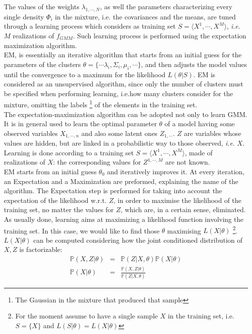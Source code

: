 \documentclass{article}
\begin{document}
The values of the weights $\lambda_{1,\cdots,N}$, as well the parameters characterizing every single density $\Phi_i$ in the mixture, i.e. the covariances and the means, are tuned through a learning process which considers as training set $S = \langle X^1, \cdots  , X^M \rangle$, \textit{i.e.} $M$ realizations of $f_{GMM}$. Such learning process is performed using the expectation maximization algorithm.
\\
EM, is essentially an iterative algorithm that starts from an initial guess for the parameters of the clusters $\theta = \lbrace \cdots \lambda_i, \Sigma_i, \mu_i, \cdots \rbrace$, and then adjusts the model values until the convergence to a maximum for the likelihood $L(\theta | S)$.
EM is considered as an unsupervised algorithm, since only the number of clusters must be specified when performing learning, i.e.how many clusters consider for the mixture, omitting the labels \footnote{The Gaussian in the mixture that produced that sample} of the elements in the training set.
\\
The expectation-maximization algorithm can be adopted not only to learn GMM.  It is in general used to learn the optimal parameter $\theta$ of a model having some observed variables $X_{1,\cdots,n}$ and also some latent ones $Z_{1,\cdots}$. $Z$ are variables whose values are hidden, but are linked in a probabilistic way to those observed, \textit{i.e.} $X$. 
Learning is done according to a training set $S = \langle X^1, \cdots , X^M \rangle$, made of realizations of $X$: the corresponding values for $Z^{1,\cdots,M}$ are not known.  
\\
EM starts from an initial guess $\theta_0$ and iteratively improves it.
At every iteration, an Expectation and a Maximization are preformed, explaining the name of the algorithm. The Expectation step is performed for taking into account the expectation of the likelihood w.r.t. $Z$, in order to maximise the likelihood of the training set, no matter the values for $Z$, which are, in a certain sense, eliminated.
\\
As usually done, learning aims at maximizing a likelihood function involving the training set. In this case, we would like to find those $\theta$ maximising $L(X|\theta)$ \footnote{For the moment assume to have a single sample $X$ in the training set, i.e. $S=\lbrace X \rbrace$ and $L(S|\theta) = L(X|\theta)$}. $L(X|\theta)$ can be computed considering how the joint conditioned distribution of $X,Z$ is factorizable: 
\begin{eqnarray}
\mathbb{P}(X,Z|\theta) &=& \mathbb{P}(Z|X,\theta) \mathbb{P}(X|\theta) \nonumber\\
\mathbb{P}(X|\theta) &=& \frac{\mathbb{P}(X,Z|\theta)}{\mathbb{P}(Z|X,\theta)} 
\end{eqnarray}
\end{document}
